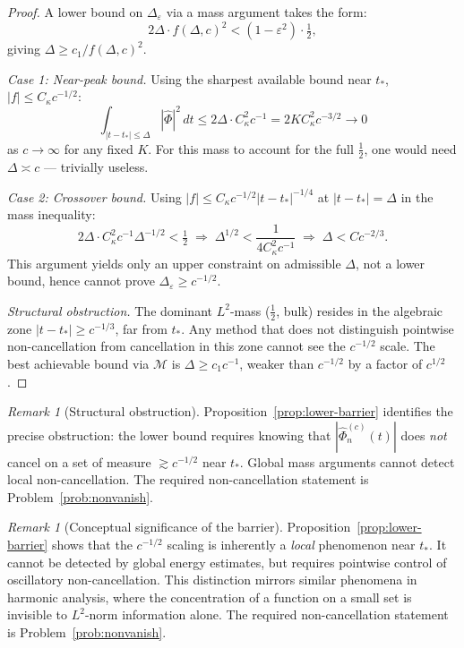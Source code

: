 \documentclass[12pt,a4paper]{amsart}
\theoremstyle{definition}
\theoremstyle{remark}
\newtheorem{remark}[theorem]{Remark}
\begin{document}
\begin{proof}
A lower bound on $\Delta_\varepsilon$
via a mass argument takes the form:
\[
2\Delta \cdot f(\Delta, c)^2
< (1-\varepsilon^2) \cdot \tfrac{1}{2},
\]
giving $\Delta \ge c_1/f(\Delta,c)^2$.

\textit{Case 1: Near-peak bound.}
Using the sharpest available bound near $t_*$,
$|f| \le C_\kappa c^{-1/2}$:
\[
\int_{|t-t_*|\le\Delta}|\widehat{\Phi}|^2\,dt
\le 2\Delta \cdot C_\kappa^2 c^{-1}
= 2KC_\kappa^2 c^{-3/2} \to 0
\]
as $c \to \infty$ for any fixed $K$.
For this mass to account for the full $\tfrac12$,
one would need $\Delta \asymp c$ --- trivially useless.

\textit{Case 2: Crossover bound.}
Using $|f| \le C_\kappa c^{-1/2}|t-t_*|^{-1/4}$
at $|t-t_*|=\Delta$ in the mass inequality:
\[
2\Delta \cdot C_\kappa^2 c^{-1}\Delta^{-1/2} < \tfrac12
\;\Longrightarrow\;
\Delta^{1/2} < \frac{1}{4C_\kappa^2 c^{-1}}
\;\Longrightarrow\;
\Delta < C c^{-2/3}.
\]
This argument yields only an upper constraint
on admissible $\Delta$, not a lower bound,
hence cannot prove $\Delta_\varepsilon \ge c^{-1/2}$.

\textit{Structural obstruction.}
The dominant $L^2$-mass ($\tfrac{1}{2}$, bulk)
resides in the algebraic zone $|t - t_*| \ge c^{-1/3}$,
far from $t_*$.
Any method that does not distinguish
pointwise non-cancellation from cancellation
in this zone cannot see the $c^{-1/2}$ scale.
The best achievable bound via $\mathcal{M}$ is
$\Delta \ge c_1 c^{-1}$,
weaker than $c^{-1/2}$ by a factor of $c^{1/2}$.
\end{proof}

\begin{remark}[Structural obstruction]
\label{rem:structural}
Proposition~\ref{prop:lower-barrier}
identifies the precise obstruction:
the lower bound requires knowing that
$|\widehat{\Phi}_n^{(c)}(t)|$ does
\emph{not} cancel on a set of measure
$\gtrsim c^{-1/2}$ near $t_*$.
Global mass arguments cannot detect
local non-cancellation.
The required non-cancellation statement
is Problem~\ref{prob:nonvanish}.
\end{remark}

\begin{remark}[Conceptual significance of the barrier]
\label{rem:conceptual}
Proposition~\ref{prop:lower-barrier} shows that
the $c^{-1/2}$ scaling is inherently a \emph{local}
phenomenon near $t_*$.
It cannot be detected by global energy estimates,
but requires pointwise control of oscillatory
non-cancellation.
This distinction mirrors similar phenomena in
harmonic analysis, where the concentration of a
function on a small set is invisible to
$L^2$-norm information alone.
The required non-cancellation statement is
Problem~\ref{prob:nonvanish}.
\end{remark}
\end{document}
